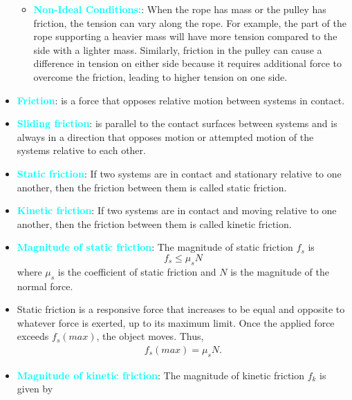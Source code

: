 \documentclass{report}
\begin{document}
\begin{itemize}
\begin{itemize}
                \item \textbf{\textcolor{cyan}{Non-Ideal Conditions:}}: When the rope has mass or the pulley has friction, the tension can vary along the rope. For example, the part of the rope supporting a heavier mass will have more tension compared to the side with a lighter mass. Similarly, friction in the pulley can cause a difference in tension on either side because it requires additional force to overcome the friction, leading to higher tension on one side.
                \end{itemize}
                \item \textbf{\textcolor{cyan}{Friction}}: is a force that opposes relative motion between systems in contact.
                \item \textbf{\textcolor{cyan}{Sliding friction}}: is parallel to the contact surfaces between systems and is always in a direction that opposes motion or attempted motion of the systems relative to each other. 
                \item \textbf{\textcolor{cyan}{Static friction}}: If two systems are in contact and stationary relative to one another, then the friction between them is called static friction. 
                \item \textbf{\textcolor{cyan}{Kinetic friction}}: If two systems are in contact and moving relative to one another, then the friction between them is called kinetic friction.
                \item \textbf{\textcolor{cyan}{Magnitude of static friction}}:
                    The magnitude of static friction $f_s$ is
                    \begin{equation}
                        f_s \leq \mu_s N
                    \end{equation}
                    where $\mu_s$ is the coefficient of static friction and $N$ is the magnitude of the normal force.
                \item  Static friction is a responsive force that increases to be equal and opposite to whatever force is exerted, up to its maximum limit. Once the applied force exceeds $f_{s}(max)$, the object moves. Thus,
                    \begin{align*}
                        f_{s}(max) = \mu_{s}N
                    .\end{align*}
                \item \textbf{\textcolor{cyan}{Magnitude of kinetic friction}}:
                    The magnitude of kinetic friction $f_k$ is given by

\end{itemize}
\end{document}
